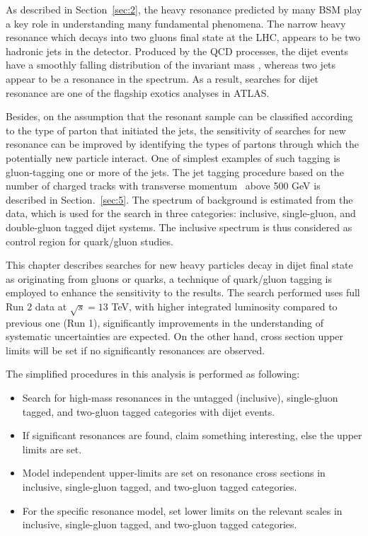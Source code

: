 As described in Section~\ref{sec:2}, the heavy resonance predicted by many BSM play a key role in understanding many fundamental phenomena. The narrow heavy resonance which decays into two gluons final state at the LHC, appears to be two hadronic jets in the detector. Produced by the QCD processes, the dijet events have a smoothly falling distribution of the invariant mass \mjj, whereas two jets appear to be a resonance in the \mjj spectrum. As a result, searches for dijet resonance are one of the flagship exotics analyses in ATLAS.


Besides, on the assumption that the resonant sample can be classified according to the type of parton that initiated the jets, the sensitivity of searches for new resonance can be improved by identifying the types of partons through which the potentially new particle interact.  One of simplest examples of such tagging is gluon-tagging one or more of the jets. The jet tagging procedure based on the number of
charged tracks with transverse momentum \pt~above 500 GeV is described in Section.~\ref{sec:5}. The \mjj spectrum of background is estimated from the data, which is used for the search in three categories: inclusive, single-gluon, and double-gluon tagged dijet systems. The inclusive \mjj spectrum is thus considered as control region for quark/gluon studies.



This chapter describes searches for new heavy particles decay in dijet final state as originating from gluons or quarks, a technique of quark/gluon tagging is employed to enhance the sensitivity to the results. The search performed uses full Run 2 data at $\sqrt{s} = 13$ TeV, with higher integrated luminosity compared to previous one (Run 1), significantly improvements in the understanding of systematic uncertainties are expected. On the other hand,  cross section upper limits will be set if no significantly resonances are observed.

The simplified procedures in this analysis is performed as following: 
\begin{itemize}
	\item Search for high-mass resonances in the untagged (inclusive), single-gluon tagged,
	and two-gluon tagged categories with dijet events.
	\item If significant resonances are found, claim something interesting, else the upper limits are set. 
	\item Model independent upper-limits are set on resonance cross sections in
	inclusive, single-gluon tagged, and two-gluon tagged categories.
	\item For the specific resonance model, set lower limits on the relevant scales in inclusive, single-gluon tagged, and two-gluon tagged categories.
\end{itemize}

